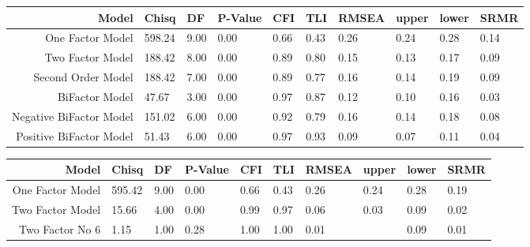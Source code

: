 \documentclass{article}\usepackage[]{graphicx}\usepackage[]{color}
\begin{document}
\begin{table}[ht]
\centering
\begin{tabular}{rlllllllll}
  \hline
Model & Chisq & DF & P-Value & CFI & TLI & RMSEA & upper & lower & SRMR \\
  \hline
  One Factor Model & 598.24 &   9.00 &   0.00 &   0.66 &   0.43 &   0.26 &   0.24 &   0.28 &   0.14 \\ 
  Two Factor Model & 188.42 &   8.00 &   0.00 &   0.89 &   0.80 &   0.15 &   0.13 &   0.17 &   0.09 \\ 
  Second Order Model & 188.42 &   7.00 &   0.00 &   0.89 &   0.77 &   0.16 &   0.14 &   0.19 &   0.09 \\ 
  BiFactor Model & 47.67 &  3.00 &  0.00 &  0.97 &  0.87 &  0.12 &  0.10 &  0.16 &  0.03 \\ 
  Negative BiFactor Model & 151.02 &   6.00 &   0.00 &   0.92 &   0.79 &   0.16 &   0.14 &   0.18 &   0.08 \\ 
  Positive BiFactor Model & 51.43 &  6.00 &  0.00 &  0.97 &  0.93 &  0.09 &  0.07 &  0.11 &  0.04 \\ 
   \hline
\end{tabular}
\end{table}

\begin{table}[ht]
\centering
\begin{tabular}{rlllllllll}
  \hline
Model & Chisq & DF & P-Value & CFI & TLI & RMSEA & upper & lower & SRMR \\
  \hline
  One Factor Model & 595.42 &   9.00 &   0.00 &   0.66 &   0.43 &   0.26 &   0.24 &   0.28 &   0.19 \\ 
  Two Factor Model & 15.66 &  4.00 &  0.00 &  0.99 &  0.97 &  0.06 &  0.03 &  0.09 &  0.02 \\ 
  Two Factor No 6 & 1.15 & 1.00 & 0.28 & 1.00 & 1.00 & 0.01 &  & 0.09 & 0.01 \\ 
   \hline
\end{tabular}
\end{table}
\end{document}

